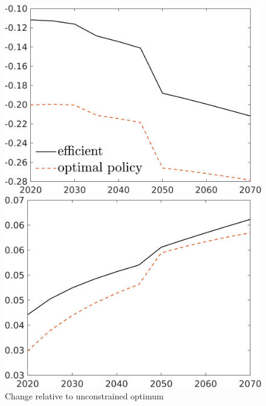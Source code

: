 \begin{figure}[h!!]
\begin{minipage}[]{0.32\textwidth}
	\end{minipage}
\end{figure} 

\begin{figure}[h!!]
	\centering
	\caption{Change relative to unconstrained optimum }\label{fig:optAll_percEffOpt_dyn}
	
	
	\begin{minipage}[]{0.32\textwidth}
		\includegraphics[width=1\textwidth]{../../codding_model/own_basedOnFried/optimalPol_190722_tidiedUp/figures/all_Aout22/C_PercentageEffOptDyn_Target_regime3_spillover0_noskill0_sep1_xgrowth0_etaa0.79_lgd1.png}
	\end{minipage}
	\begin{minipage}[]{0.32\textwidth}
		\includegraphics[width=1\textwidth]{../../codding_model/own_basedOnFried/optimalPol_190722_tidiedUp/figures/all_Aout22/hh_PercentageBAUDyn_Target_regime3_spillover0_noskill1_sep1_xgrowth0_etaa0.79_lgd0.png}

\end{minipage}
\end{figure}
